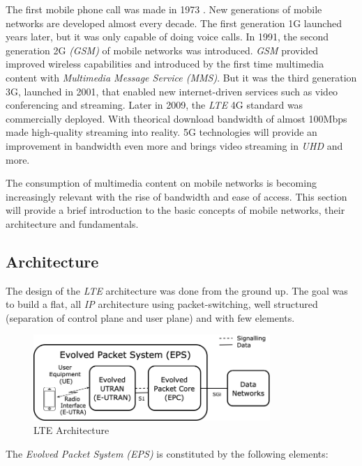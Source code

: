 The first mobile phone call was made in 1973 \cite{mob1}. New generations of mobile networks 
are developed almost every decade. The first generation 1G launched years later, but
it was only capable of doing voice calls. In 1991, the second generation 2G \textit{(GSM)} of 
mobile networks was introduced. \textit{GSM} provided improved wireless capabilities and 
introduced by the first time multimedia content with \textit{Multimedia Message Service (MMS)}.
But it was the third generation 3G, launched in 2001, that enabled new internet-driven
services such as video conferencing and streaming. Later in 2009, the \textit{LTE} 4G standard
was commercially deployed. With theorical download bandwidth of almost 100Mbps made high-quality
streaming into reality. 5G technologies will provide an improvement in bandwidth even more and brings 
video streaming in \textit{UHD} and more.

The consumption of multimedia content on mobile networks is becoming increasingly relevant with 
the rise of bandwidth and ease of access. This section will provide a brief introduction to the 
basic concepts of mobile networks, their architecture and fundamentals.

\subsection{Architecture}
\label{sec:eps}

The design of the \textit{LTE} architecture was done from the ground up. The goal was to build a flat, all
\textit{IP} architecture using packet-switching, well structured (separation of control plane and user plane)
and with few elements.

\begin{figure}[h]
  \centering
  \includegraphics[width=0.8\textwidth]{img/eps.png}
  \caption{LTE Architecture}
  \label{fig:eps}
\end{figure}

The \textit{Evolved Packet System (EPS)} is constituted by the following elements:

